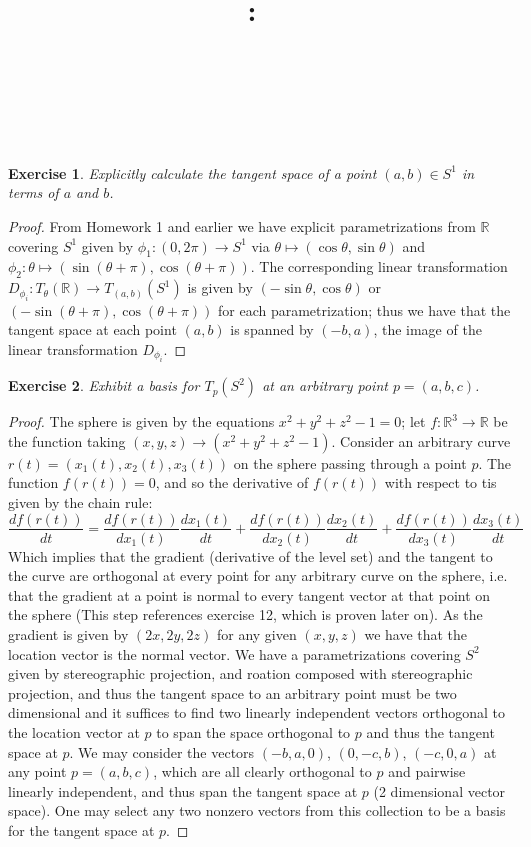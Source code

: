 \documentclass{article}
\title{
    \vspace{2in}
    \textmd{\textbf{\hmwkClass:\ \hmwkTitle}}\\
    \vspace{0.1in}
    \textmd{\hmwkDueDate} \\
    \vspace{0.2in}\large{\textit{\hmwkClassInstructor\  }}
    \vspace{2in}
}
\author{\hmwkAuthorName}
\date{}
\newtheorem{exercise}{Exercise}
\begin{document}
\maketitle

\pagebreak

\begin{exercise}
Explicitly calculate the tangent space of a point $(a,b) \in S^{1}$ in terms of $a$ and $b$. 
  \end{exercise}
  \begin{proof}
    From Homework 1 and earlier we have explicit parametrizations from $\mathbb{R}$ covering $S^{1}$ given by $\phi_{1}: (0,2\pi) \to S^{1}$ via $\theta \mapsto (\cos\theta, \sin\theta)$ and $\phi_{2}: \theta \mapsto (\sin(\theta + \pi), \cos(\theta + \pi))$. The corresponding linear transformation $D_{\phi_{i}}: T_{\theta}(\mathbb{R}) \to T_{(a,b)}(S^{1})$ is given by $(-\sin\theta, \cos\theta)$ or $(-\sin(\theta + \pi), \cos(\theta + \pi))$ for each parametrization; thus we have that the tangent space at each point $(a,b)$ is spanned by $(-b,a)$, the image of the linear transformation $D_{\phi_{i}}$. 
    \end{proof}

    \begin{exercise}
Exhibit a basis for $T_{p}(S^{2})$ at an arbitrary point $p = (a,b,c)$.
      \end{exercise}
      \begin{proof}
        The sphere is given by the equations $x^{2}+y^{2}+z^{2}-1=0$; let $f: \mathbb{R}^{3} \to \mathbb{R}$ be the function taking $(x,y,z) \to (x^{2}+y^{2}+z^{2}-1)$. Consider an arbitrary curve $r(t) = (x_{1}(t),x_{2}(t), x_{3}(t))$ on the sphere passing through a point $p$. The function $f(r(t))=0$, and so the derivative of $f(r(t))$ with respect to tis given by the chain rule:
        \[
          \frac{df(r(t))}{dt} = \frac{df(r(t))}{dx_{1}(t)}\frac{dx_{1}(t)}{dt} + \frac{df(r(t))}{dx_{2}(t)}\frac{dx_{2}(t)}{dt} + \frac{df(r(t))}{dx_{3}(t)}\frac{dx_{3}(t)}{dt}
        \]
        Which implies that the gradient (derivative of the level set) and the tangent to the curve are orthogonal at every point for any arbitrary curve on the sphere, i.e. that the gradient at a point is normal to every tangent vector at that point on the sphere (This step references exercise 12, which is proven later on). As the gradient is given by $(2x,2y,2z)$ for any given $(x,y,z)$ we have that the location vector is the normal vector.
        We have a parametrizations covering $S^{2}$ given by stereographic projection, and roation composed with stereographic projection, and thus the tangent space to an arbitrary point must be two dimensional and it suffices to find two linearly independent vectors orthogonal to the location vector at $p$ to span the space orthogonal to $p$ and thus the tangent space at $p$. We may consider the vectors $(-b,a,0)$, $(0,-c,b)$, $(-c,0,a)$ at any point $p=(a,b,c)$, which are all clearly orthogonal to $p$ and pairwise linearly independent, and thus span the tangent space at $p$ (2 dimensional vector space). One may select any two nonzero vectors from this collection to be a basis for the tangent space at $p$.
         
      \end{proof}
\end{document}
